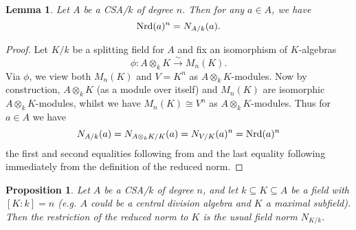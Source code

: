 \documentclass[11pt]{amsart}
\numberwithin{equation}{section}
\newtheorem{lemma}[equation]{Lemma}
\newtheorem{proposition}[equation]{Proposition}
\theoremstyle{remark}
\theoremstyle{remark}
\theoremstyle{remark}
\theoremstyle{definition}
\theoremstyle{definition}
\theoremstyle{definition}
\theoremstyle{definition}
\theoremstyle{definition}
\theoremstyle{definition}
\begin{document}
\begin{lemma} \label{reducedness of norm}
Let $A$ be a CSA/$k$ of degree $n$. Then for any $a\in A$, we have
\[\textup{Nrd}(a)^n=N_{A/k}(a).\]
\end{lemma}

\begin{proof}
Let $K/k$ be a splitting field for $A$ and fix an isomorphism of $K$-algebras
\[\phi:A\otimes_k K \stackrel{\sim}{\longrightarrow}M_n(K).\]
Via $\phi$, we view both $M_n(K)$ and $V=K^n$ as $A\otimes_k K$-modules. Now by construction, $A\otimes_k K$ (as a module over itself) and $M_n(K)$ are isomorphic $A\otimes_k K$-modules, whilst we have $M_n(K)\cong V^n$ as $A\otimes_k K$-modules. Thus for $a\in A$ we have
\[N_{A/k}(a)=N_{A\otimes_k K/K}(a)=N_{V/K}(a)^n=\textup{Nrd}(a)^n\]
the first and second equalities following from  and the last equality following immediately from the definition of the reduced norm. 
\end{proof}


\begin{proposition} \label{field norm on max subfield}
Let $A$ be a CSA/$k$ of degree $n$, and let $k\subseteq K\subseteq A$ be a field with $[K:k]=n$ (e.g. $A$ could be a central division algebra and $K$ a maximal subfield). Then the restriction of the reduced norm to $K$ is the usual field norm $N_{K/k}$. 
\end{proposition}
\end{document}
